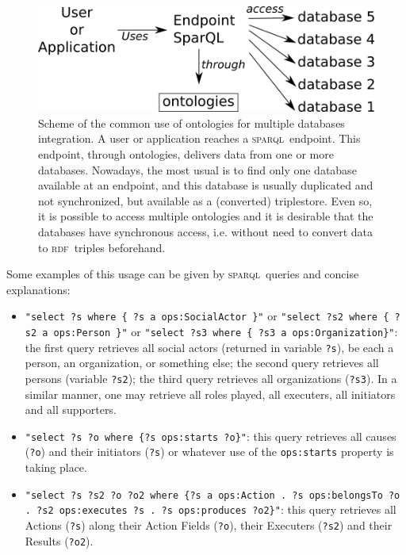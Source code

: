 \documentclass[10pt,letterpaper]{article}
\newcommand{\sparql}{\textsc{sparql}}
\newcommand{\rdf}{\textsc{rdf}}
\begin{document}
\begin{figure}[!h]
    \centering
        \includegraphics[width=0.9\columnwidth]{figs/endpoint}
    \caption{Scheme of the common use of ontologies for multiple databases integration.
    A user or application reaches a \sparql\ endpoint.
    This endpoint, through ontologies, delivers data from one or more databases.
    Nowadays, the most usual is to find only one database available at an endpoint,
    and this database is usually duplicated and not synchronized,
    but available as a (converted) triplestore.
    Even so,
    it is possible to access multiple ontologies and it is desirable that the databases have synchronous access,
    i.e. without need to convert data to \rdf\ triples beforehand.}
    \label{endpoint}
\end{figure}

Some examples of this usage can be given by \sparql\ queries and concise explanations:
\begin{itemize}
    \item \texttt{"select ?s where \{ ?s a ops:SocialActor \}"} or
    \texttt{"select ?s2 where \{ ?s2 a ops:Person \}"} or
    \texttt{"select ?s3 where \{ ?s3 a ops:Organization\}"}:
    the first query retrieves all social actors (returned in variable \texttt{?s}),
    be each a person, an organization, or something else;
    the second query retrieves all persons (variable \texttt{?s2});
    the third query retrieves all organizations (\texttt{?s3}).
    In a similar manner, one may retrieve all roles played, all executers, all initiators and all supporters.
    \item \texttt{"select ?s ?o where \{?s ops:starts ?o\}"}:
    this query retrieves all causes ({\tt ?o}) and their initiators ({\tt ?s})
    or whatever use of the {\tt ops:starts} property is taking place.
    \item \texttt{"select ?s ?s2 ?o ?o2 where \{?s a ops:Action . ?s ops:belongsTo ?o . ?s2 ops:executes ?s . ?s ops:produces ?o2\}"}:
    this query retrieves all Actions (\texttt{?s}) along their Action Fields (\texttt{?o}),
    their Executers (\texttt{?s2}) and their Results (\texttt{?o2}).
\end{itemize}
\end{document}
